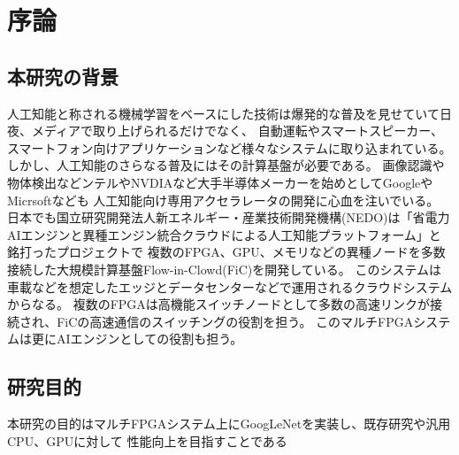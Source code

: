 \chapter{序論}
{
    \label{chap:introducion}

    \section{本研究の背景}
    \label{sec:backgroud}
    人工知能と称される機械学習をベースにした技術は爆発的な普及を見せていて日夜、メディアで取り上げられるだけでなく、
    自動運転やスマートスピーカー、スマートフォン向けアプリケーションなど様々なシステムに取り込まれている。
    しかし、人工知能のさらなる普及にはその計算基盤が必要である。
    画像認識や物体検出などンテルやNVDIAなど大手半導体メーカーを始めとしてGoogleやMicrsoftなども
    人工知能向け専用アクセラレータの開発に心血を注いでいる。
    日本でも国立研究開発法人新エネルギー・産業技術開発機構(NEDO)は「省電力AIエンジンと異種エンジン統合クラウドによる人工知能プラットフォーム」と銘打ったプロジェクトで
    複数のFPGA、GPU、メモリなどの異種ノードを多数接続した大規模計算基盤Flow-in-Clowd(FiC)を開発している。
    このシステムは車載などを想定したエッジとデータセンターなどで運用されるクラウドシステムからなる。
    複数のFPGAは高機能スイッチノードとして多数の高速リンクが接続され、FiCの高速通信のスイッチングの役割を担う。
    このマルチFPGAシステムは更にAIエンジンとしての役割も担う。

    \section{研究目的}
    \label{sec:purpose}
    本研究の目的はマルチFPGAシステム上にGoogLeNetを実装し、既存研究や汎用CPU、GPUに対して
    性能向上を目指すことである

}
